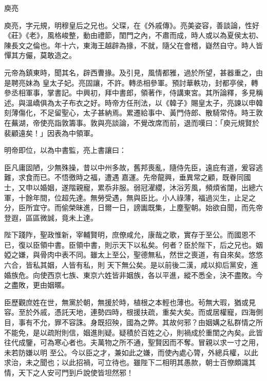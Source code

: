 
\begin{pinyinscope}
庾亮



 庾亮，字元規，明穆皇后之兄也。父琛，在《外戚傳》。亮美姿容，善談論，性好《莊》《老》，風格峻整，動由禮節，閨門之內，不肅而成，時人或以為夏侯太初、陳長文之倫也。年十六，東海王越辟為掾，不就，隨父在會稽，嶷然自守。時人皆憚其方儼，莫敢造之。



 元帝為鎮東時，聞其名，辟西曹掾。及引見，風情都雅，過於所望，甚器重之，由是聘亮妹為
 皇太子妃。亮固讓，不許。轉丞相參軍。預討華軼功，封都亭侯，轉參丞相軍事，掌書記。中興初，拜中書郎，領著作，侍講東宮。其所論釋，多見稱述。與溫嶠俱為太子布衣之好。時帝方任刑法，以《韓子》賜皇太子，亮諫以申韓刻薄傷化，不足留聖心，太子甚納焉。累遷給事中、黃門侍郎、散騎常侍。時王敦在蕪湖，帝使亮詣敦籌事。敦與亮談論，不覺改席而前，退而嘆曰：「庾元規賢於裴顧遠矣！」因表為中領軍。



 明帝即位，以為中書監，亮上書讓曰：



 臣凡庸固陋，少無殊操，昔以中州多故，舊邦喪亂，隨侍先臣，遠庇有道，爰容逃難，求食而已。不悟徼時之福，遭遇
 嘉運。先帝龍興，垂異常之顧，既眷同國士，又申以婚姻，遂階親寵，累忝非服。弱冠濯纓，沐浴芳風，頻煩省闥，出總六軍，十餘年間，位超先達。無勞受遇，無與臣比。小人祿薄，福過災生，止足之分，臣所宜守。而偷榮昧進，日爾一日，謗讟既集，上塵聖朝。始欲自聞，而先帝登遐，區區微誠，竟未上達。



 陛下踐阼，聖政惟新，宰輔賢明，庶僚咸允，康哉之歌，實存于至公。而國恩不已，復以臣領中書。臣領中書，則示天下以私矣。何者？臣於陛下，后之兄也。姻婭之嫌，與骨肉中表不同。雖太上至公，聖德無私，然世之喪道，有自來矣。悠悠六合，皆私其姻，人皆有私，則
 天下無公矣。是以前後二漢，咸以抑后黨安，進婚族危。向使西京七族、東京六姓皆非姻族，各以平進，縱不悉全，決不盡敗。今之盡敗，更由姻暱。



 臣歷觀庶姓在世，無黨於朝，無援於時，植根之本輕也薄也。茍無大瑕，猶或見容。至於外戚，憑託天地，連勢四時，根援扶疏，重矣大矣。而或居權寵，四海側目，事有不允，罪不容誅。身既招殃，國為之弊。其故何邪？由姻媾之私群情之所不能免，是以疏附則信，姻進則疑。疑積於百姓之心，則禍成於重閨之內矣。此皆往代成鑒，可為寒心者也。夫萬物之所不通，聖賢因而不奪。冒親以求一寸之用，未若防嫌以明
 至公。今以臣之才，兼如此之嫌，而使內處心膂，外總兵權，以此求治，未之聞也；以此招禍，可立待也。雖陛下二相明其愚款，朝士百僚頗識其情，天下之人安可門到戶說使皆坦然邪！




\end{pinyinscope}
